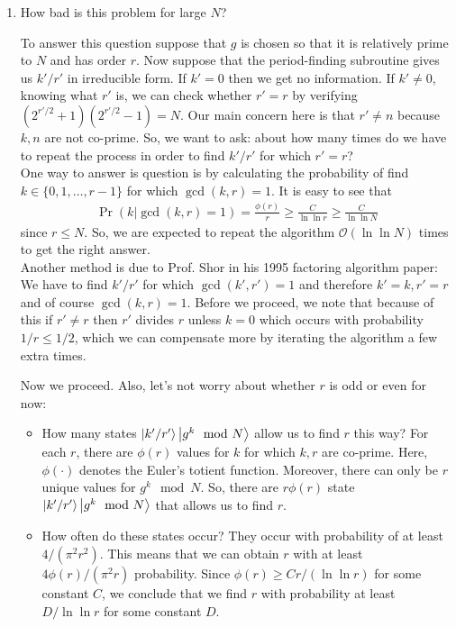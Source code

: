 \documentclass{article}
\theoremstyle{definition}
\newcommand{\f}[2]{\frac{#1}{#2}}
\begin{document}
\begin{enumerate}[label=(\alph*)]

\item How bad is this problem for large $N$?

\noindent To answer this question suppose that $g$ is chosen so that it is relatively prime to $N$ and has order $r$. Now suppose that the period-finding subroutine gives us $k'/r'$ in irreducible form. If $k'=0$ then we get no information. If $k'\neq 0$, knowing what $r'$ is, we can check whether $r' = r$ by verifying $(2^{r'/2}+1)(2^{r'/2}-1) = N$. Our main concern here is that $r'\neq n$ because $k,n$ are not co-prime. So, we want to ask: about how many times do we have to repeat the process in order to find $k'/r'$ for which $r'=r$? \\



One way to answer is question is by calculating the probability of find $k\in \{ 0, 1,\dots, r-1 \}$ for which $\gcd(k,r) = 1$. It is easy to see that
\begin{align*}
	\Pr(k | \gcd(k,r) = 1) = \f{\phi(r)}{ r} \geq \f{C}{\ln \ln r} \geq \f{C}{\ln \ln N}
\end{align*}
since $r\leq N$. So, we are expected to repeat the algorithm $\mathcal{O}(\ln \ln N)$ times to get the right answer.\\

Another method is due to Prof. Shor in his 1995 factoring algorithm paper: We have to find $k'/r'$ for which $\gcd(k',r')=1$ and therefore $k'=k, r'=r$ and of course $\gcd(k,r) = 1$. Before we proceed, we note that because of this if $r'\neq r$ then $r'$ divides $r$ unless $k =0$ which occurs with probability $1/r \leq 1/2$, which we can compensate more by iterating the algorithm a few extra times. 

Now we proceed. Also, let's not worry about whether $r$ is odd or even for now:
\begin{itemize}
	\item How many states $\ket{k'/r'}\ket{g^k \mod N}$ allow us to find $r$ this way? For each $r$, there are $\phi(r)$ values for $k$ for which $k,r$ are co-prime. Here, $\phi(\cdot)$ denotes the Euler's totient function. Moreover, there can only be $r$ unique values for $g^k \mod N$. So, there are $r\phi(r)$ state $\ket{k'/r'}\ket{g^k \mod N}$ that allows us to find $r$.
	
	\item How often do these states occur?  They occur with probability of at least $4/(\pi^2 r^2)$. This means that we can obtain $r$ with at least $4\phi(r)/(\pi^2 r)$ probability. Since $\phi(r) \geq Cr/(\ln \ln r)$ for some constant $C$, we conclude that we find $r$ with probability at least $D/ \ln \ln r$ for some constant $D$.
	

\end{itemize}
\end{enumerate}
\end{document}
